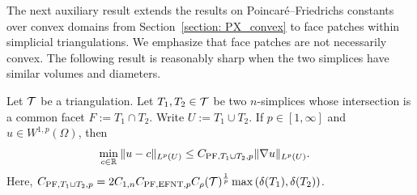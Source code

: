 \documentclass[10pt,a4paper]{article}
\begin{document}


The next auxiliary result extends the results on Poincar\'e--Friedrichs constants over convex domains from Section~\ref{section: PX_convex} to face patches within simplicial triangulations. We emphasize that face patches are not necessarily convex. The following result is reasonably sharp when the two simplices have similar volumes and diameters.

\begin{lemma}\label{lemma:poincarefriedrichsoverfacepatch}
    Let ${\mathcal T}$ be a triangulation.
    Let $T_{1}, T_{2} \in {\mathcal T}$ be two $n$-simplices whose intersection is a common facet $F := T_1 \cap T_2$. 
    Write $U := T_1 \cup T_2$. 
    If $p \in [1,\infty]$ and $u \in W^{1,p}(\Omega)$,
    then 
    \begin{align*}
        \min\limits_{ c \in {\mathbb R} }
        \| u - c \|_{L^{p}(U)}
        &
        \leq 
        C_{{{\rm PF}},T_1 \cup T_2,p}
        \| \nabla u \|_{L^{p}(U)}
        .
    \end{align*}
    Here, $C_{{{\rm PF}},T_1 \cup T_2,p} = 2 C_{1,n} C_{{\rm PF},{\rm EFNT},p} C_\rho({\mathcal T})^{\frac 1 p} \max\left( {\delta}(T_1), {\delta}(T_2) \right)$. 
\end{lemma}
\end{document}

